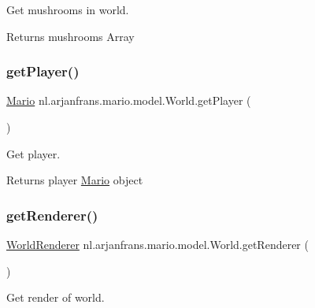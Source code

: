 Get mushrooms in world. 

\begin{DoxyReturn}{Returns}
mushrooms Array 
\end{DoxyReturn}
\mbox{\label{classnl_1_1arjanfrans_1_1mario_1_1model_1_1World_a08a107e2e429df5092b7bd2198d4553a}} 
\subsubsection{\texorpdfstring{get\+Player()}{getPlayer()}}
{\footnotesize\ttfamily \hyperlink{classnl_1_1arjanfrans_1_1mario_1_1model_1_1Mario}{Mario} nl.\+arjanfrans.\+mario.\+model.\+World.\+get\+Player (\begin{DoxyParamCaption}{ }\end{DoxyParamCaption})}



Get player. 

\begin{DoxyReturn}{Returns}
player \hyperlink{classnl_1_1arjanfrans_1_1mario_1_1model_1_1Mario}{Mario} object 
\end{DoxyReturn}
\mbox{\label{classnl_1_1arjanfrans_1_1mario_1_1model_1_1World_a931f9fe3450c07ec17c8f14dcd3ec58e}} 
\subsubsection{\texorpdfstring{get\+Renderer()}{getRenderer()}}
{\footnotesize\ttfamily \hyperlink{classnl_1_1arjanfrans_1_1mario_1_1view_1_1WorldRenderer}{World\+Renderer} nl.\+arjanfrans.\+mario.\+model.\+World.\+get\+Renderer (\begin{DoxyParamCaption}{ }\end{DoxyParamCaption})}



Get render of world. 

